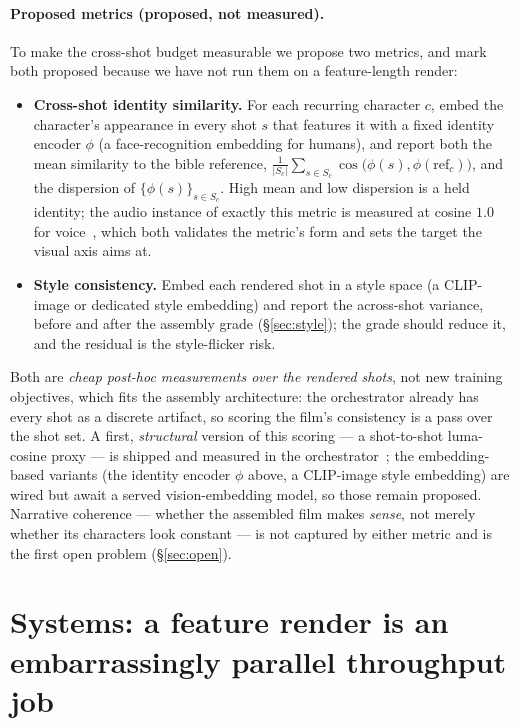 \documentclass[11pt]{article}
\begin{document}
\paragraph{Proposed metrics (proposed, not measured).} To make the cross-shot budget measurable we propose two
metrics, and mark both proposed because we have not run them on a feature-length render:
\begin{itemize}[leftmargin=1.4em,itemsep=2pt]
\item \textbf{Cross-shot identity similarity.} For each recurring character $c$, embed the character's appearance
in every shot $s$ that features it with a fixed identity encoder $\phi$ (a face-recognition embedding for
humans), and report both the mean similarity to the bible reference,
$\frac{1}{|S_c|}\sum_{s\in S_c}\cos\!\big(\phi(s),\phi(\text{ref}_c)\big)$, and the dispersion of
$\{\phi(s)\}_{s\in S_c}$. High mean and low dispersion is a held identity; the audio instance of exactly this
metric is measured at cosine $1.0$ for voice~\cite{games}, which both validates the metric's form and sets the
target the visual axis aims at.
\item \textbf{Style consistency.} Embed each rendered shot in a style space (a CLIP-image or dedicated style
embedding) and report the across-shot variance, before and after the assembly grade (\S\ref{sec:style}); the
grade should reduce it, and the residual is the style-flicker risk.
\end{itemize}
Both are \emph{cheap post-hoc measurements over the rendered shots}, not new training objectives, which fits the
assembly architecture: the orchestrator already has every shot as a discrete artifact, so scoring the film's
consistency is a pass over the shot set. A first, \emph{structural} version of this scoring --- a shot-to-shot
luma-cosine proxy --- is shipped and measured in the orchestrator~\cite{film}; the embedding-based variants (the
identity encoder $\phi$ above, a CLIP-image style embedding) are wired but await a served vision-embedding model,
so those remain proposed. Narrative coherence --- whether the assembled film makes \emph{sense},
not merely whether its characters look constant --- is not captured by either metric and is the first open problem
(\S\ref{sec:open}).

\section{Systems: a feature render is an embarrassingly parallel throughput job}
\label{sec:systems}
\end{document}
